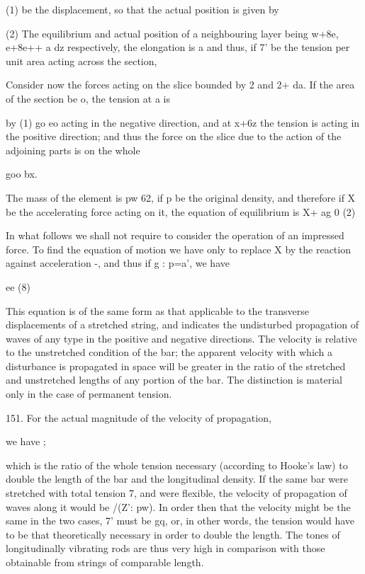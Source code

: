 (1) be the displacement, so that the actual position is given by

(2) The equilibrium and actual position
of a neighbouring layer being w+8e, e+8e++ a dz respectively, the
elongation is a and thus, if 7' be the tension per
unit area acting across the section,

Consider now the forces acting on the slice bounded by 2 and 2+ da. If
the area of the section be o, the tension at a is

by (1) go eo acting in the negative direction, and at x+6z
the tension is
acting in the positive direction; and thus the force on the slice due to
the action of the adjoining parts is on the whole

goo bx.

The mass of the element is pw 62, if p be the original density, and
therefore if X be the accelerating force acting on it, the equation of
equilibrium is X+ ag 0 (2)

In what follows we shall not require to consider the operation of an
impressed force. To find the equation of motion we have only to replace
X by the reaction against acceleration -, and thus if g : p=a', we have

ee (8)

This equation is of the same form as that applicable to the transverse
displacements of a stretched string, and indicates the undisturbed
propagation of waves of any type in the positive and negative
directions. The velocity is relative to the unstretched condition of the
bar; the apparent velocity with which a disturbance is propagated in
space will be greater in the ratio of the stretched and unstretched
lengths of any portion of the bar. The distinction is material only in
the case of permanent tension.

151. For the actual magnitude of the velocity of propagation,

we have ;

which is the ratio of the whole tension necessary (according to Hooke's law)
to double the length of the bar and the longitudinal density. If
the same bar were stretched with total tension 7, and were flexible, the
velocity of propagation of waves along it would be /(Z': pw). In order
then that the velocity might be the same in the two cases, 7' must be
gq, or, in other words, the tension would have to be that theoretically
necessary in order to double the length. The tones of longitudinally
vibrating rods are thus very high in comparison with those obtainable
from strings of comparable length.

